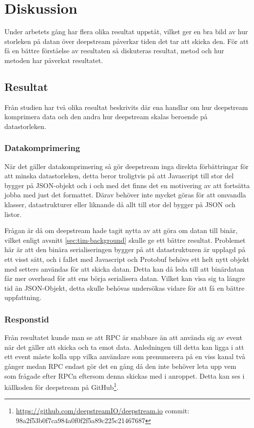 \section{Diskussion}
\label{sec:tim-discussion}
Under arbetets gång har flera olika resultat uppståt, vilket ger en bra bild av hur storleken på datan över deepstream påverkar tiden det tar att skicka den. För att få en bättre förståelse av resultaten så diskuteras resultat, metod och hur metoden har påverkat resultatet. 

\subsection{Resultat}
\label{subsec:tim-discussion-results}
Från studien har två olika resultat beskrivits där ena handlar om hur deepstream komprimera data och den andra hur deepstream skalas beroende på datastorleken.

\subsubsection{Datakomprimering}
När det gäller datakomprimering så gör deepstream inga direkta förbättringar för att minska datastorleken, detta beror troligtvis på att Javascript till stor del bygger på JSON-objekt och i och med det finns det en motivering av att fortsätta jobba med just det formattet. Därav behöver inte mycket göras för att omvandla klasser, datastrukturer eller liknande då allt till stor del bygger på JSON och listor.

Frågan är då om deepstream hade tagit nytta av att göra om datan till binär, vilket enligt avsnitt \ref{sec:tim-background} skulle ge ett bättre resultat. Problemet här är att den binära serialiseringen bygger på att datastrukturen är upplagd på ett visst sätt, och i fallet med Javascript och Protobuf behövs ett helt nytt objekt med setters användas för att skicka datan. Detta kan då leda till att binärdatan får mer overhead för att ens börja serialisera datan. Vilket kan visa sig ta längre tid än JSON-Objekt, detta skulle behövas undersökas vidare för att få en bättre uppfattning.

\subsubsection{Responstid}
Från resultatet kunde man se att RPC är snabbare än att använda sig av event när det gäller att skicka och ta emot data. Anledningen till detta kan ligga i att ett event måste kolla upp vilka användare som prenumerera på en viss kanal två gånger medan RPC endast gör det en gång då den inte behöver leta upp vem som frågade efter RPCn eftersom denna skickas med i anroppet. Detta kan ses i källkoden för deepstream på GitHub\footnote{\url{https://github.com/deepstreamIO/deepstream.io} \newline commit: 98a2f53b0f7ca984a0f0f2f5a89c225c21467687}. 

